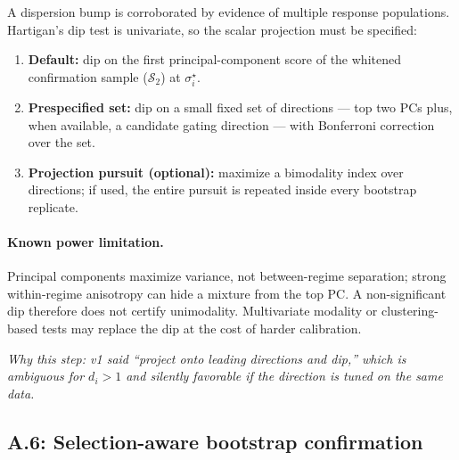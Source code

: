 \documentclass[11pt]{article}
\newcommand{\why}[1]{\par\noindent\textcolor{muted}{\small\itshape Why this step: #1}}
\begin{document}
A dispersion bump is corroborated by evidence of multiple response populations. Hartigan's
dip test is univariate, so the scalar projection must be specified:
\begin{enumerate}[label=\textbf{P\arabic*.},leftmargin=2.6em]
  \item \textbf{Default:} dip on the first principal-component score of the whitened
  confirmation sample (\(\mathcal S_2\)) at \(\sigma_i^\star\).
  \item \textbf{Prespecified set:} dip on a small fixed set of directions --- top two PCs
  plus, when available, a candidate gating direction --- with Bonferroni correction over the
  set.
  \item \textbf{Projection pursuit (optional):} maximize a bimodality index over directions;
  if used, the entire pursuit is repeated inside every bootstrap replicate.
\end{enumerate}
\paragraph{Known power limitation.} Principal components maximize variance, not between-regime
separation; strong within-regime anisotropy can hide a mixture from the top PC. A
non-significant dip therefore does not certify unimodality. Multivariate modality or
clustering-based tests may replace the dip at the cost of harder calibration.
\why{v1 said ``project onto leading directions and dip,'' which is ambiguous for \(d_i>1\)
and silently favorable if the direction is tuned on the same data.}

\subsection{A.6: Selection-aware bootstrap confirmation}
\label{sec:bootstrap}
\end{document}
